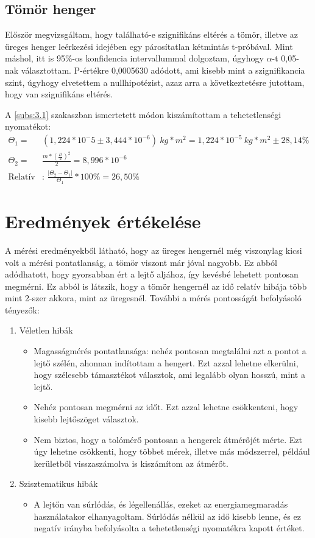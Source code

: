 \documentclass[twoside]{article}
\begin{document}
	\subsection{Tömör henger}
		Először megvizsgáltam, hogy található-e szignifikáns eltérés a tömör, illetve az üreges henger leérkezési idejében egy párosítatlan kétmintás t-próbával. Mint máshol, itt is 95\%-os konfidencia intervallummal dolgoztam, úgyhogy $\alpha$-t 0,05-nak választottam. P-értékre 0,0005630 adódott, ami kisebb mint a szignifikancia szint, úgyhogy elvetettem a nullhipotézist, azaz arra a következtetésre jutottam, hogy van szignifikáns eltérés.
		
		A \ref{subs:3.1} szakaszban ismertetett módon kiszámítottam a tehetetlenségi nyomatékot:
		\begin{align}
			\Theta_1=&\left(1,224*10^-5\pm3,444*10^{-6}\right)\ kg* m^2=1,224*10^{-5}\ kg*m^2
			\pm 28,14\%\label{eq:29}\\
			\Theta_2=&\frac{m*\left(\frac{D}{2}\right)^2}{2}=8,996*10^{-6}\label{eq:30}\\
			\text{Relatív eltérés}&\text{: } \frac{|\Theta_2-\Theta_1|}{\Theta_1}*100\%=26,50\%
			\label{eq:31}
		\end{align}
\section{Eredmények értékelése}
	A mérési eredményekből látható, hogy az üreges hengernél még viszonylag kicsi volt a mérési pontatlanság, a tömör viszont már jóval nagyobb. Ez abból adódhatott, hogy gyorsabban ért a lejtő aljához, így kevésbé lehetett pontosan megmérni. Ez abból is látszik, hogy a tömör hengernél az idő relatív hibája több mint 2-szer akkora, mint az üregesnél. További a mérés pontosságát befolyásoló tényezők:
	\begin{enumerate}
		\item Véletlen hibák\\
			\begin{itemize}
				\item Magasságmérés pontatlansága: nehéz pontosan megtalálni azt a pontot a lejtő szélén, ahonnan indítottam a hengert. Ezt azzal lehetne elkerülni, hogy szélesebb támasztékot választok, ami legalább olyan hosszú, mint a lejtő.
				\item Nehéz pontosan megmérni az időt. Ezt azzal lehetne csökkenteni, hogy kisebb lejtőszöget választok.
				\item Nem biztos, hogy a tolómérő pontosan a hengerek átmérőjét mérte. Ezt úgy lehetne csökkenti, hogy többet mérek, illetve más módszerrel, például kerületből visszaszámolva is kiszámítom az átmérőt.
			\end{itemize}
		\item Szisztematikus hibák\\
			\begin{itemize}
				\item A lejtőn van súrlódás, és légellenállás, ezeket az energiamegmaradás használatakor elhanyagoltam. Súrlódás nélkül az idő kisebb lenne, és ez negatív irányba befolyásolta a tehetetlenségi nyomatékra kapott értéket.
			\end{itemize}
	\end{enumerate}
\end{document}
